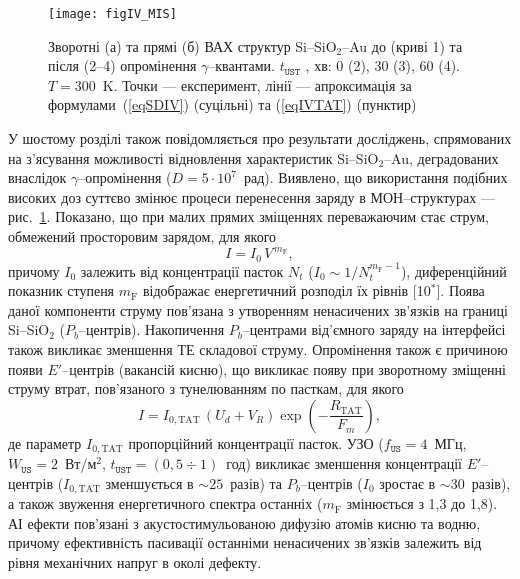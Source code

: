 \begin{figure}[b]
\center
\texttt{[image: figIV\_MIS]}%
\caption{\label{figIV_MIS}
Зворотні (а) та прямі (б) ВАХ структур Si--SiO$_2$--Au до (криві 1)
та після (2--4) опромінення $\gamma$--квантами.
$t_\mathtt{UST}$ , хв: 0 (2), 30 (3), 60 (4).
$T=300$~K.
Точки --- експеримент,
лінії --- апроксимація за формулами~(\ref{eqSDIV}) (суцільні) та (\ref{eqIVTAT}) (пунктир)
}%
\end{figure}
У шостому розділі також повідомляється про результати досліджень, спрямованих на з'ясування можливості відновлення характеристик Si--SiO$_2$--Au,
деградованих внаслідок $\gamma$--опромінення ($D=5\cdot10^7$~рад).
Виявлено, що використання подібних високих доз суттєво змінює процеси перенесення заряду в МОН--структурах --- рис.~\ref{figIV_MIS}.
Показано, що при малих прямих зміщеннях переважаючим стає струм, обмежений просторовим зарядом, для якого
\begin{equation}\label{eqVIsclc}
  I=I_0\,V^{\,m_\mathrm{F}},
\end{equation}
причому $I_0$ залежить від концентрації пасток $N_t$ ($I_0\sim 1/N_t^{m_\mathrm{F}-1}$),
диференційний показник ступеня $m_\mathrm{F}$ відображає енергетичний розподіл їх рівнів
[10$^*$].
Поява даної компоненти струму пов'язана з утворенням ненасичених зв'язків на границі Si--SiO$_2$ ($P_b$--центрів).
Накопичення $P_b$--центрами від'ємного заряду на інтерфейсі також викликає зменшення ТЕ складової струму.
Опромінення також є причиною появи $E'$--центрів (вакансій кисню), що
викликає появу при зворотному зміщенні струму втрат, пов'язаного з тунелюванням по пасткам, для якого
\begin{equation}\label{eqIVTAT}
  I=I_{0,\mathrm{TAT}}\,(U_d+V_R)\exp\left(-\frac{R_\mathrm{TAT}}{F_m}\right),
\end{equation}
де параметр $I_{0,\mathrm{TAT}}$ пропорційний концентрації пасток.
УЗО
($f_\mathtt{US}=4$~МГц, $W_\mathtt{US}=2$~Вт/м$^2$, $t_\mathtt{UST}=(0,5\div1)$~год) викликає зменшення концентрації
$E'$--центрів ($I_{0,\mathrm{TAT}}$ зменшується в $\sim25$~разів) та  $P_b$--центрів ($I_0$ зростає в $\sim30$~разів),
а також звуження енергетичного спектра останніх ($m_\mathrm{F}$ змінюється з 1,3 до 1,8).
АІ ефекти пов'язані з акустостимульованою дифузію  атомів кисню та водню, причому ефективність пасивації останніми ненасичених зв'язків залежить
від рівня механічних напруг в околі дефекту.



